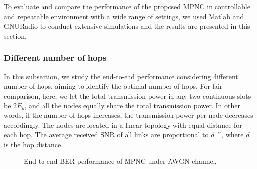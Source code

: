 To evaluate and compare the performance of the proposed MPNC in controllable and repeatable environment with a wide range of settings, we used Matlab and GNURadio to conduct extensive simulations and the results are presented in this section. 


\iffalse

\subsubsection{Different number of hops} %
\label{sub:awgn}
In this subsection, we study the end-to-end performance considering different number of hops, aiming to identify the optimal number of hops. 
For fair comparison, here, we let the total transmission power in any two continuous slots be $2E_b$, and all the nodes equally share the total transmission power. In other words, if the number of hops increases, the transmission power per node decreases accordingly. The nodes are located in a linear topology with equal distance for each hop.  The average received SNR of all links are proportional to $d^{-\alpha}$, where $d$ is the hop distance. %

\begin{figure}
    \centering
    \caption{End-to-end BER performance of MPNC under AWGN channel.}\label{ber-D-MPNC}
\end{figure}

